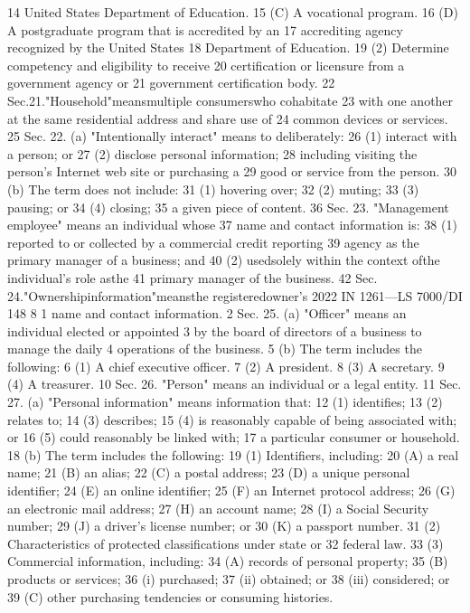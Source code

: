 14 United States Department of Education.
15 (C) A vocational program.
16 (D) A postgraduate program that is accredited by an
17 accrediting agency recognized by the United States
18 Department of Education.
19 (2) Determine competency and eligibility to receive
20 certification or licensure from a government agency or
21 government certification body.
22 Sec.21."Household"meansmultiple consumerswho cohabitate
23 with one another at the same residential address and share use of
24 common devices or services.
25 Sec. 22. (a) "Intentionally interact" means to deliberately:
26 (1) interact with a person; or
27 (2) disclose personal information;
28 including visiting the person's Internet web site or purchasing a
29 good or service from the person.
30 (b) The term does not include:
31 (1) hovering over;
32 (2) muting;
33 (3) pausing; or
34 (4) closing;
35 a given piece of content.
36 Sec. 23. "Management employee" means an individual whose
37 name and contact information is:
38 (1) reported to or collected by a commercial credit reporting
39 agency as the primary manager of a business; and
40 (2) usedsolely within the context ofthe individual's role asthe
41 primary manager of the business.
42 Sec. 24."Ownershipinformation"meansthe registeredowner's
2022 IN 1261—LS 7000/DI 148
8
1 name and contact information.
2 Sec. 25. (a) "Officer" means an individual elected or appointed
3 by the board of directors of a business to manage the daily
4 operations of the business.
5 (b) The term includes the following:
6 (1) A chief executive officer.
7 (2) A president.
8 (3) A secretary.
9 (4) A treasurer.
10 Sec. 26. "Person" means an individual or a legal entity.
11 Sec. 27. (a) "Personal information" means information that:
12 (1) identifies;
13 (2) relates to;
14 (3) describes;
15 (4) is reasonably capable of being associated with; or
16 (5) could reasonably be linked with;
17 a particular consumer or household.
18 (b) The term includes the following:
19 (1) Identifiers, including:
20 (A) a real name;
21 (B) an alias;
22 (C) a postal address;
23 (D) a unique personal identifier;
24 (E) an online identifier;
25 (F) an Internet protocol address;
26 (G) an electronic mail address;
27 (H) an account name;
28 (I) a Social Security number;
29 (J) a driver's license number; or
30 (K) a passport number.
31 (2) Characteristics of protected classifications under state or
32 federal law.
33 (3) Commercial information, including:
34 (A) records of personal property;
35 (B) products or services;
36 (i) purchased;
37 (ii) obtained; or
38 (iii) considered; or
39 (C) other purchasing tendencies or consuming histories.
